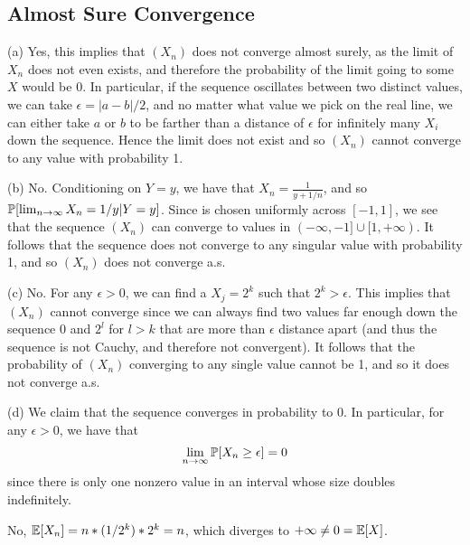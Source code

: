 \subsection{Almost Sure Convergence}
(a) Yes, this implies that $(X_n)$ does not converge almost surely, as the limit of $X_n$ does not even exists, and therefore the probability of the limit going to some $X$ would be 0. In particular, if the sequence oscillates between two distinct values, we can take $\epsilon = |a - b| / 2$, and no matter what value we pick on the real line, we can either take $a$ or $b$ to be farther than a distance of $\epsilon$ for infinitely many $X_i$ down the sequence. Hence the limit does not exist and so $(X_n)$ cannot converge to any value with probability 1.

(b) No. Conditioning on $Y = y$, we have that $X_n = \frac{1}{y + 1/n}$, and so $\P[\lim_{n \to \infty} X_n = 1/y | Y = y]$. Since is chosen uniformly across $[-1, 1]$, we see that the sequence $(X_n)$ can converge to values in $(-\infty, -1]\cup[1, +\infty)$. It follows that the sequence does not converge to any singular value with probability 1, and so $(X_n)$ does not converge a.s.

(c) No. For any $\epsilon > 0$, we can find a $X_j = 2^k$ such that $2^k > \epsilon$. This implies that $(X_n)$ cannot converge since we can always find two values far enough down the sequence 0 and $2^l$ for $l > k$ that are more than $\epsilon$ distance apart (and thus the sequence is not Cauchy, and therefore not convergent). It follows that the probability of $(X_n)$ converging to any single value cannot be 1, and so it does not converge a.s.

(d) We claim that the sequence converges in probability to 0. In particular, for any $\epsilon > 0$, we have that
\[
\lim_{n \to \infty}\P[X_n \geq \epsilon] = 0
\]
since there is only one nonzero value in an interval whose size doubles indefinitely.

No, $\E[X_n] = n * (1/2^k) * 2^k = n$, which diverges to $+\infty \neq 0 = \E[X]$.

